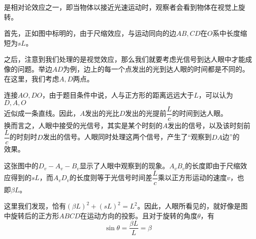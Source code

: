 \begin{solution}
     是相对论效应之一，即当物体以接近光速运动时，观察者会看到物体在视觉上旋转。
    
    首先，正如图中标明的，由于尺缩效应，与运动同向的边$AB,CD$在$O$系中长度缩短为$sL$。
    
    之后，注意到我们处理的是视觉效应，那么我们就要考虑光信号到达人眼中才能成像的问题。举边$AD$为例，边上的每一个点发出的光到达人眼的时间都是不同的。在这里，我们考虑$A,D$两点。
    
    连接$AO,DO$，由于题目条件中说，人与正方形的距离远远大于$L$，可以认为$D,A,O$\\[1ex]
    近似成一条直线。因此，$A$发出的光比$D$发出的光提前$\dfrac{L}{c}$的时间到达人眼。\\[1ex]
    换而言之，人眼中接受的光信号，其实是某个时刻的$A$发出的信号，以及该时刻前\\[1ex]
    $\dfrac{L}{c}$的时刻时$D$发出的信号。人眼同时处理这两个信号，产生了“观察到$DA$边”的\\[1ex]
    效果。
    
    
    这张图中的$D_v-A_v-B_v$显示了人眼中观察到的现象。$A_vB_v$的长度即由于尺缩效\\[1ex]
    应得到的$sL$，而$A_vD_v$的长度则等于光信号时间差$\dfrac{L}{c}$乘以正方形运动的速度$v$，也\\[1ex]
    即$\beta L$。
    
    这里我们发现，恰有$(\beta L)^2 + (sL)^2 = L^2$。因此，人眼所看见的，就好像是图中旋转后的正方形$ABCD$在运动方向的投影。且对于旋转的角度$\theta$，有
    \[\sin\theta=\dfrac{\beta L}{L}=\beta\]
\end{solution}
